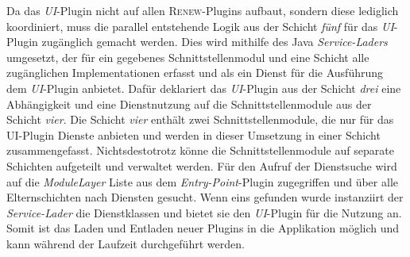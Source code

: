 	Da das \textit{UI}-Plugin nicht auf allen \textsc{Renew}-Plugins aufbaut, sondern diese lediglich koordiniert, muss die parallel entstehende Logik aus der Schicht \textit{fünf} für das \textit{UI}-Plugin zugänglich gemacht werden. Dies wird mithilfe des Java \textit{Service-Laders} umgesetzt, der für ein gegebenes Schnittstellenmodul und eine Schicht alle zugänglichen Implementationen erfasst und als ein Dienst für die Ausführung dem \textit{UI}-Plugin anbietet. Dafür deklariert das \textit{UI}-Plugin aus der Schicht \textit{drei} eine Abhängigkeit und eine Dienstnutzung auf die Schnittstellenmodule aus der Schicht \textit{vier}. Die Schicht \textit{vier} enthält zwei Schnittstellenmodule, die nur für das UI-Plugin Dienste anbieten und werden in dieser Umsetzung in einer Schicht zusammengefasst. Nichtsdestotrotz könne die Schnittstellenmodule auf separate Schichten aufgeteilt und verwaltet werden. \newline 
	Für den Aufruf der Dienstsuche wird auf die \textit{ModuleLayer} Liste aus dem \textit{Entry-Point}-Plugin zugegriffen und über alle Elternschichten nach Diensten gesucht. Wenn eins gefunden wurde instanziirt der \textit{Service-Lader} die Dienstklassen und bietet sie den \textit{UI}-Plugin für die Nutzung an. Somit ist das Laden und Entladen neuer Plugins in die Applikation möglich und kann während der Laufzeit durchgeführt werden.  

